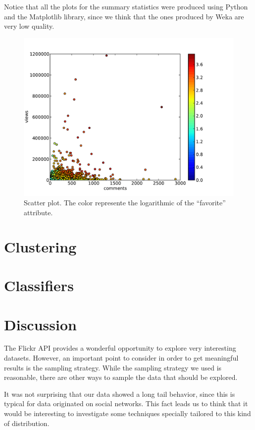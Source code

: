 \documentclass[letter,12pt]{article}
\begin{document}
Notice that all the plots for the summary statistics were produced using Python and the Matplotlib library, since we think that the ones produced by Weka are very low quality.

\begin{figure}[!h]
\centering
\includegraphics[scale=0.6]{scatter.pdf} 
\caption{Scatter plot. The color represente the logarithmic of the ``favorite'' attribute.}
\label{fig:scatter}
\end{figure}

\section{Clustering}

\section{Classifiers}\label{sec:classifier}

\section{Discussion}

The Flickr API provides a wonderful opportunity to explore very interesting datasets. However, an important point to consider in order to get meaningful results is the sampling strategy. While the sampling strategy we used is reasonable, there are other ways to sample the data that should be explored.

It was not surprising that our data showed a long tail behavior, since this is typical for data originated on social networks. This fact leads us to think that it would be interesting to investigate some techniques specially tailored to this kind of distribution.  
\end{document}
